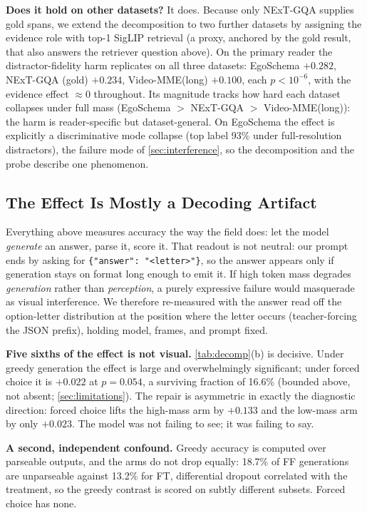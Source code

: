 \documentclass[10pt,twocolumn,letterpaper]{article}
\begin{document}
\noindent\textbf{Does it hold on other datasets?} It does. Because only NExT-GQA supplies gold spans, we extend the decomposition to two further datasets by assigning the evidence role with top-1 SigLIP retrieval (a proxy, anchored by the gold result, that also answers the retriever question above). On the primary reader the distractor-fidelity harm replicates on all three datasets: EgoSchema $+0.282$, NExT-GQA (gold) $+0.234$, Video-MME(long) $+0.100$, each $p{<}10^{-6}$, with the evidence effect $\approx0$ throughout. Its magnitude tracks how hard each dataset collapses under full mass (EgoSchema $>$ NExT-GQA $>$ Video-MME(long)): the harm is reader-specific but dataset-general. On EgoSchema the effect is explicitly a discriminative mode collapse (top label 93\% under full-resolution distractors), the failure mode of \cref{sec:interference}, so the decomposition and the probe describe one phenomenon.


\subsection{The Effect Is Mostly a Decoding Artifact}
\label{sec:readout}

Everything above measures accuracy the way the field does: let the model \emph{generate} an answer, parse it, score it. That readout is not neutral: our prompt ends by asking for \texttt{\{"answer": "<letter>"\}}, so the answer appears only if generation stays on format long enough to emit it. If high token mass degrades \emph{generation} rather than \emph{perception}, a purely expressive failure would masquerade as visual interference. We therefore re-measured with the answer read off the option-letter distribution at the position where the letter occurs (teacher-forcing the JSON prefix), holding model, frames, and prompt fixed.

\noindent\textbf{Five sixths of the effect is not visual.} \cref{tab:decomp}(b) is decisive. Under greedy generation the effect is large and overwhelmingly significant; under forced choice it is $+0.022$ at $p{=}0.054$, a surviving fraction of 16.6\% (bounded above, not absent; \cref{sec:limitations}). The repair is asymmetric in exactly the diagnostic direction: forced choice lifts the high-mass arm by $+0.133$ and the low-mass arm by only $+0.023$. The model was not failing to see; it was failing to say.

\noindent\textbf{A second, independent confound.} Greedy accuracy is computed over parseable outputs, and the arms do not drop equally: 18.7\% of FF generations are unparseable against 13.2\% for FT, differential dropout correlated with the treatment, so the greedy contrast is scored on subtly different subsets. Forced choice has none.
\end{document}
